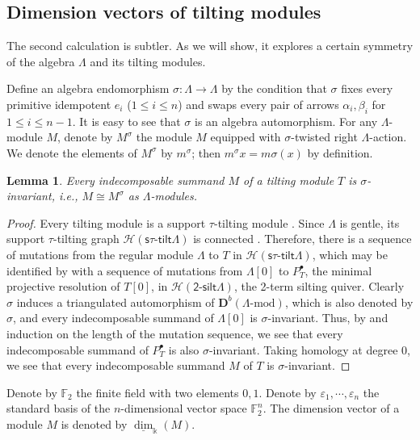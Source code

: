 \documentclass[11pt,reqno]{amsart}
\theoremstyle{plain}
\newtheorem{lemma}[theorem]{Lemma}
\theoremstyle{definition}
\theoremstyle{remark}
\numberwithin{equation}{section}
\begin{document}
\subsection{Dimension vectors of tilting modules}
\par The second calculation is subtler. As we will show, it explores a certain symmetry of the algebra $\Lambda$ and its tilting modules.
\par Define an algebra endomorphism $\sigma:\Lambda\to\Lambda$ by the condition that $\sigma$ fixes every primitive idempotent $e_i$ ($1\leq i\leq n$) and swaps every pair of arrows $\alpha_i,\beta_i$ for $1\leq i\leq n-1$. It is easy to see that $\sigma$ is an algebra automorphism. For any $\Lambda$-module $M$, denote by $M^\sigma$ the module $M$ equipped with $\sigma$-twisted right $\Lambda$-action. We denote the elements of $M^\sigma$ by $m^\sigma$; then $m^\sigma x=m\sigma(x)$ by definition.
\begin{lemma}
    Every indecomposable summand $M$ of a tilting module $T$ is $\sigma$-invariant, i.e., $M\cong M^\sigma$ as $\Lambda$-modules.
\end{lemma}
\begin{proof}
    Every tilting module is a support $\tau$-tilting module \cite[Proposition 2.2(b)]{AIR}. Since $\Lambda$ is gentle, its support $\tau$-tilting graph $\mathcal{H}(\mathsf{s\tau\text{-}tilt}\Lambda)$ is connected \cite{FGLZ}. Therefore, there is a sequence of mutations from the regular module $\Lambda$ to $T$ in $\mathcal{H}(\mathsf{s\tau\text{-}tilt}\Lambda)$, which may be identified by \cite[Theorem 3.2, Corollary 3.9]{AIR} with a sequence of mutations from $\Lambda[0]$ to $P^\bullet_T$, the minimal projective resolution of $T[0]$, in $\mathcal{H}(\mathsf{2\text{-}silt}\Lambda)$, the 2-term silting quiver. Clearly $\sigma$ induces a triangulated automorphism of $\mathbf{D}^b(\Lambda\text{-}\mathrm{mod})$, which is also denoted by $\sigma$, and every indecomposable summand of $\Lambda[0]$ is $\sigma$-invariant. Thus, by \cite[Proposition 2.1]{Dug} and induction on the length of the mutation sequence, we see that every indecomposable summand of $P^\bullet_T$ is also $\sigma$-invariant. Taking homology at degree 0, we see that every indecomposable summand $M$ of $T$ is $\sigma$-invariant.
\end{proof}
\par Denote by $\mathbb{F}_2$ the finite field with two elements $0,1$. Denote by $\varepsilon_1,\cdots,\varepsilon_n$ the standard basis of the $n$-dimensional vector space $\mathbb{F}_2^n$. The dimension vector of a module $M$ is denoted by $\underline{\dim}_\Bbbk(M)$.
\end{document}
